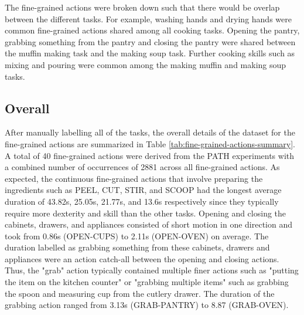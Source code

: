 The fine-grained actions were broken down such that there would be overlap between the different tasks. For example, washing hands and drying hands were common fine-grained actions shared among all cooking tasks. Opening the pantry, grabbing something from the pantry and closing the pantry were shared between the muffin making task and the making soup task. Further cooking skills such as mixing and pouring were common among the making muffin and making soup tasks. 

\subsection{Overall}

After manually labelling all of the tasks, the overall details of the dataset for the fine-grained actions are summarized in Table \ref{tab:fine-grained-actions-summary}. A total of 40 fine-grained actions were derived from the PATH experiments with a combined number of occurrences of 2881 across all fine-grained actions. As expected, the continuous fine-grained actions that involve preparing the ingredients such as PEEL, CUT, STIR, and SCOOP had the longest average duration of 43.82s, 25.05s, 21.77s, and 13.6s respectively since they typically require more dexterity and skill than the other tasks. Opening and closing the cabinets, drawers, and appliances consisted of short motion in one direction and took from 0.86s (OPEN-CUPS) to 2.11s (OPEN-OVEN) on average. The duration labelled as grabbing something from these cabinets, drawers and appliances were an action catch-all between the opening and closing actions. Thus, the "grab" action typically contained multiple finer actions such as "putting the item on the kitchen counter" or "grabbing multiple items" such as grabbing the spoon and measuring cup from the cutlery drawer. The duration of the grabbing action ranged from 3.13s (GRAB-PANTRY) to 8.87 (GRAB-OVEN).


